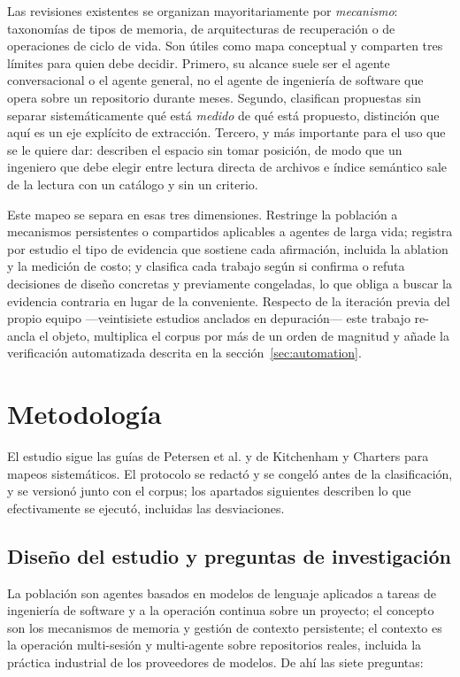 \documentclass[conference]{IEEEtran}
\begin{document}
Las revisiones existentes se organizan mayoritariamente por \emph{mecanismo}: taxonomías de tipos de
memoria, de arquitecturas de recuperación o de operaciones de ciclo de vida. Son útiles como mapa
conceptual y comparten tres límites para quien debe decidir. Primero, su alcance suele ser el agente
conversacional o el agente general, no el agente de ingeniería de software que opera sobre un
repositorio durante meses. Segundo, clasifican propuestas sin separar sistemáticamente qué está
\emph{medido} de qué está propuesto, distinción que aquí es un eje explícito de extracción. Tercero,
y más importante para el uso que se le quiere dar: describen el espacio sin tomar posición, de modo
que un ingeniero que debe elegir entre lectura directa de archivos e índice semántico sale de la
lectura con un catálogo y sin un criterio.

Este mapeo se separa en esas tres dimensiones. Restringe la población a mecanismos persistentes o
compartidos aplicables a agentes de larga vida; registra por estudio el tipo de evidencia que
sostiene cada afirmación, incluida la ablation y la medición de costo; y clasifica cada trabajo
según si confirma o refuta decisiones de diseño concretas y previamente congeladas, lo que obliga a
buscar la evidencia contraria en lugar de la conveniente. Respecto de la iteración previa del propio
equipo —veintisiete estudios anclados en depuración— este trabajo re-ancla el objeto, multiplica el
corpus por más de un orden de magnitud y añade la verificación automatizada descrita en la
sección~\ref{sec:automation}.

\section{Metodología}
\label{sec:method}

El estudio sigue las guías de Petersen et al. y de Kitchenham y Charters para mapeos sistemáticos. El
protocolo se redactó y se congeló antes de la clasificación, y se versionó junto con el corpus; los
apartados siguientes describen lo que efectivamente se ejecutó, incluidas las desviaciones.

\subsection{Diseño del estudio y preguntas de investigación}
\label{sec:rqs}

La población son agentes basados en modelos de lenguaje aplicados a tareas de ingeniería de software
y a la operación continua sobre un proyecto; el concepto son los mecanismos de memoria y gestión de
contexto persistente; el contexto es la operación multi-sesión y multi-agente sobre repositorios
reales, incluida la práctica industrial de los proveedores de modelos. De ahí las siete preguntas:
\end{document}
